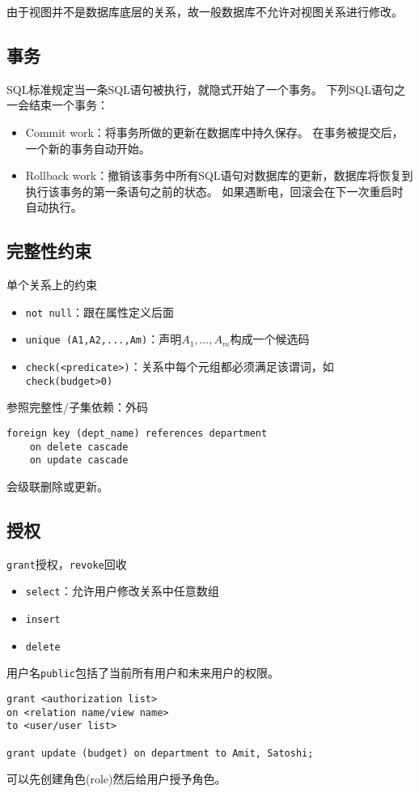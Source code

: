 由于视图并不是数据库底层的关系，故一般数据库不允许对视图关系进行修改。

\subsection{事务}
SQL标准规定当一条SQL语句被执行，就隐式开始了一个事务。
下列SQL语句之一会结束一个事务：
\begin{itemize}
	\item Commit work：将事务所做的更新在数据库中持久保存。
	在事务被提交后，一个新的事务自动开始。
	\item Rollback work：撤销该事务中所有SQL语句对数据库的更新，数据库将恢复到执行该事务的第一条语句之前的状态。
	如果遇断电，回滚会在下一次重启时自动执行。
\end{itemize}

\subsection{完整性约束}
单个关系上的约束
\begin{itemize}
	\item \verb'not null'：跟在属性定义后面
	\item \verb'unique (A1,A2,...,Am)'：声明$A_1,\ldots,A_m$构成一个候选码
	\item \verb'check(<predicate>)'：关系中每个元组都必须满足该谓词，如\verb'check(budget>0)'
\end{itemize}

参照完整性/子集依赖：外码
\begin{lstlisting}
foreign key (dept_name) references department
	on delete cascade
	on update cascade
\end{lstlisting}
会级联删除或更新。

\subsection{授权}
\verb'grant'授权，\verb'revoke'回收
\begin{itemize}
	\item \verb'select'：允许用户修改关系中任意数组
	\item \verb'insert'
	\item \verb'delete'
\end{itemize}
用户名\verb'public'包括了当前所有用户和未来用户的权限。

\begin{lstlisting}
grant <authorization list>
on <relation name/view name>
to <user/user list>

grant update (budget) on department to Amit, Satoshi;
\end{lstlisting}

可以先创建角色(role)然后给用户授予角色。